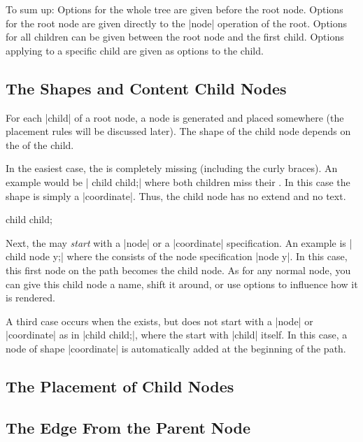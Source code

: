 To sum up: Options for the whole tree are given before the root
node. Options for the root node are given directly to the |node|
operation of the root. Options for all children can be given between
the root node and the first child. Options applying to a specific
child are given as options to the child.


\subsection{The Shapes and Content Child Nodes}

For each |child| of a root node, a node is generated and placed
somewhere (the placement rules will be discussed later). The shape of
the child node depends on the  of the child.

In the easiest case, the  is completely missing
(including the curly braces). An example would be
| child child;| where both children miss their . In this case the shape is simply a |coordinate|. Thus, the
child node has no extend and no text. 
\begin{codeexample}[]
\tikz {} child child;
\end{codeexample}

Next, the  may \emph{start} with a |node| or a
|coordinate| specification. An example is
| child {node {y}};| where the  consists
of the node specification  |node {y}|. In this case, this first node
on the path becomes the child node. As for any normal node, you can
give this child node a name, shift it around, or use options to
influence how it is rendered.
\begin{codeexample}[]
\end{codeexample}

A third case occurs when the  exists, but does not
start with a |node| or |coordinate| as in
|child {child};|, where the  start with |child|
itself. In this case, a node of shape |coordinate| is automatically
added at the beginning of the path. 

\subsection{The Placement of Child Nodes}

\subsection{The Edge From the Parent Node}





